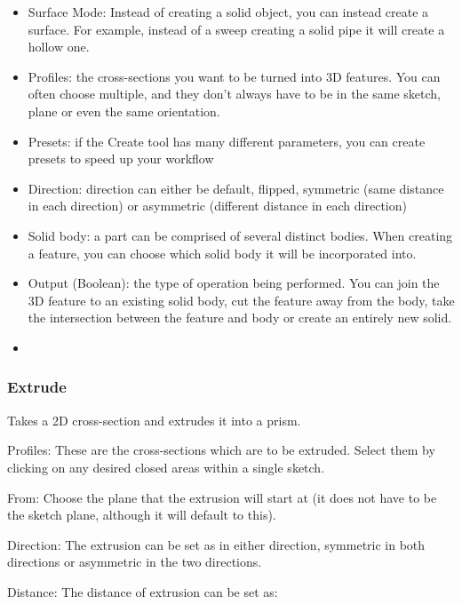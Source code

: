 \begin{itemize}

\item Surface Mode: Instead of creating a solid object, you can instead create a surface. For example, instead of a sweep creating a solid pipe it will create a hollow one.
\item Profiles: the cross-sections you want to be turned into 3D features. You can often choose multiple, and they don't always have to be in the same sketch, plane or even the same orientation.
\item Presets: if the Create tool has many different parameters, you can create presets to speed up your workflow
\item Direction: direction can either be default, flipped, symmetric (same distance in each direction) or asymmetric (different distance in each direction)
\item Solid body: a part can be comprised of several distinct bodies. When creating a feature, you can choose which solid body it will be incorporated into.
\item Output (Boolean): the type of operation being performed. You can join the 3D feature to an existing solid body, cut the feature away from the body, take the intersection between the feature and body or create an entirely new solid.
\item 

\end{itemize}

\subsubsection{Extrude}
Takes a 2D cross-section and extrudes it into a prism. 

Profiles:
These are the cross-sections which are to be extruded. Select them by clicking on any desired closed areas within a single sketch.

From:
Choose the plane that the extrusion will start at (it does not have to be the sketch plane, although it will default to this).

Direction:
The extrusion can be set as in either direction, symmetric in both directions or asymmetric in the two directions.

Distance:
The distance of extrusion can be set as:

